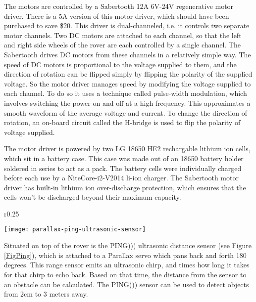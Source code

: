 The motors are controlled by a Sabertooth 12A 6V-24V regenerative motor driver. There is a 5A version of this motor driver, which should have been purchased to save \$20. This driver is dual-channeled, i.e. it controls two separate motor channels. Two DC motors are attached to each channel, so that the left and right side wheels of the rover are each controlled by a single channel. The Sabertooth drives DC motors from these channels in a relatively simple way. The speed of DC motors is proportional to the voltage supplied to them, and the direction of rotation can be flipped simply by flipping the polarity of the supplied voltage. So the motor driver manages speed by modifying the voltage supplied to each channel. To do so it uses a technique called pulse-width modulation, which involves switching the power on and off at a high frequency. This approximates a smooth waveform of the average voltage and current. To change the direction of rotation, an on-board circuit called the H-bridge is used to flip the polarity of voltage supplied. \cite{dcMotorBlog}


The motor driver is powered by two LG 18650 HE2 rechargable lithium ion cells, which sit in a battery case. This case was made out of an 18650 battery holder soldered in series to act as a pack. The battery cells were individually charged before each use by a NiteCore-i2-V2014 li-ion charger. The Sabertooth motor driver has built-in lithium ion over-discharge protection, which ensures that the cells won't be discharged beyond their maximum capacity.

\begin{wrapfigure}{r}{0.25\textwidth} %
	\caption{\cite{fig_ping}}
	\centering
	\texttt{[image: parallax-ping-ultrasonic-sensor]}
	\label{FigPing}
\end{wrapfigure}

Situated on top of the rover is the PING))) ultrasonic distance sensor (see Figure \ref{FigPing}), which is attached to a Parallax servo which pans back and forth 180 degrees. This range sensor emits an ultrasonic chirp, and times how long it takes for that chirp to echo back. Based on that time, the distance from the sensor to an obstacle can be calculated. The PING))) sensor can be used to detect objects from 2cm to 3 meters away. \cite{pingDocumentation}

